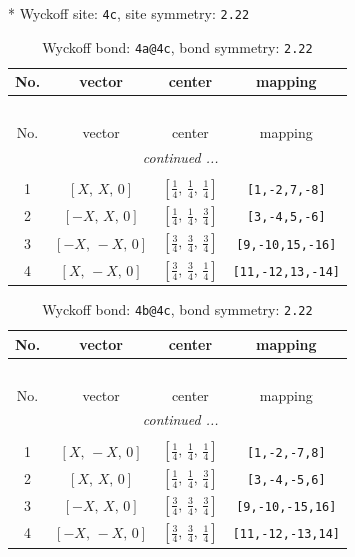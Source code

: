 \documentclass[fleqn,8pt]{jsarticle}
\begin{document}
* Wyckoff site: {\tt 4c}, site symmetry: {\tt 2.22}
\renewcommand{\arraystretch}{1.2}
\begin{longtable}{cccc}
\caption{Wyckoff bond: {\tt 4a@4c}, bond symmetry: {\tt 2.22}}
 \\
 \hline \hline
No. & vector & center & mapping \\ \hline \endfirsthead

\multicolumn{3}{l}{\tablename\ \thetable{}} \\
 \hline \hline
No. & vector & center & mapping \\ \hline \endhead

 \hline \hline
\multicolumn{3}{r}{\footnotesize\it continued ...} \\ \endfoot

 \hline \hline
\multicolumn{3}{r}{} \\ \endlastfoot

1 & $\left[ X,\, X,\, 0 \right]$ & $\left[ \frac{1}{4},\, \frac{1}{4},\, \frac{1}{4} \right]$ & {\tt [1,-2,7,-8]} \\ \hline
2 & $\left[ - X,\, X,\, 0 \right]$ & $\left[ \frac{1}{4},\, \frac{1}{4},\, \frac{3}{4} \right]$ & {\tt [3,-4,5,-6]} \\ \hline
3 & $\left[ - X,\, - X,\, 0 \right]$ & $\left[ \frac{3}{4},\, \frac{3}{4},\, \frac{3}{4} \right]$ & {\tt [9,-10,15,-16]} \\ \hline
4 & $\left[ X,\, - X,\, 0 \right]$ & $\left[ \frac{3}{4},\, \frac{3}{4},\, \frac{1}{4} \right]$ & {\tt [11,-12,13,-14]} \\
\end{longtable}
\renewcommand{\arraystretch}{1.2}
\begin{longtable}{cccc}
\caption{Wyckoff bond: {\tt 4b@4c}, bond symmetry: {\tt 2.22}}
 \\
 \hline \hline
No. & vector & center & mapping \\ \hline \endfirsthead

\multicolumn{3}{l}{\tablename\ \thetable{}} \\
 \hline \hline
No. & vector & center & mapping \\ \hline \endhead

 \hline \hline
\multicolumn{3}{r}{\footnotesize\it continued ...} \\ \endfoot

 \hline \hline
\multicolumn{3}{r}{} \\ \endlastfoot

1 & $\left[ X,\, - X,\, 0 \right]$ & $\left[ \frac{1}{4},\, \frac{1}{4},\, \frac{1}{4} \right]$ & {\tt [1,-2,-7,8]} \\ \hline
2 & $\left[ X,\, X,\, 0 \right]$ & $\left[ \frac{1}{4},\, \frac{1}{4},\, \frac{3}{4} \right]$ & {\tt [3,-4,-5,6]} \\ \hline
3 & $\left[ - X,\, X,\, 0 \right]$ & $\left[ \frac{3}{4},\, \frac{3}{4},\, \frac{3}{4} \right]$ & {\tt [9,-10,-15,16]} \\ \hline
4 & $\left[ - X,\, - X,\, 0 \right]$ & $\left[ \frac{3}{4},\, \frac{3}{4},\, \frac{1}{4} \right]$ & {\tt [11,-12,-13,14]} \\
\end{longtable}
\end{document}
